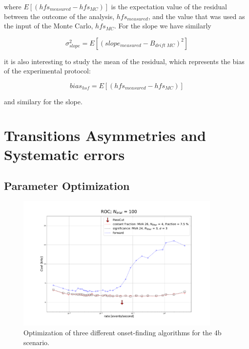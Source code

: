 \documentclass[11pt,a4paper,oneside]{article}
\newcommand{\commento}[1]{{\color{purple}{#1}}\vspace{10pt}}
\begin{document}
where $E[(hfs_{measured} - hfs_{MC})]$ is the expectation value of the residual between the outcome of the analysis, $hfs_{measured}$, and the value that was used as the input of the Monte Carlo, $hfs_{MC}$. For the slope we have similarly

\begin{equation}
\sigma_{slope}^2 = E[(slope_{measured} - B_{drift \; MC})^2]
\end{equation}

it is also interesting to study the mean of the residual, which represents the bias of the experimental protocol:

\begin{equation}
bias_{hsf} = E[(hfs_{measured} - hfs_{MC})]
\end{equation}

and similary for the slope.

\section{Transitions Asymmetries and Systematic errors}
\commento{ Discuss all the possible source of asymmetries which can influence the measurement}


\newpage
\subsection{Parameter Optimization}
\commento{ explain how the optimization works, which is the optimization space and the various types of optimization, which are:
\begin{itemize}
\item optimization without asymmetries.
\item optimization with asymmetric background due to residual gas.
\item optimization with asymmetric rise time.
\item optimization with asymmetric statistic.
\end{itemize}
}

\begin{figure}[!hbtp]
\centering
\includegraphics[width = 0.9\textwidth]{ROC_variance_bias.pdf}
\caption{Optimization of three different onset-finding algorithms for the 4b scenario.}
\commento{qui non ho fatto l'ottimizzazione scalando per il fondo!}
\end{figure}
\end{document}
